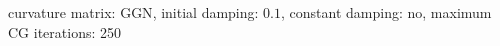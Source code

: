 curvature matrix: $\text{GGN}$, initial damping: $\num[scientific-notation=true]{0.1}$, constant damping: $\text{no}$, maximum CG iterations: 250